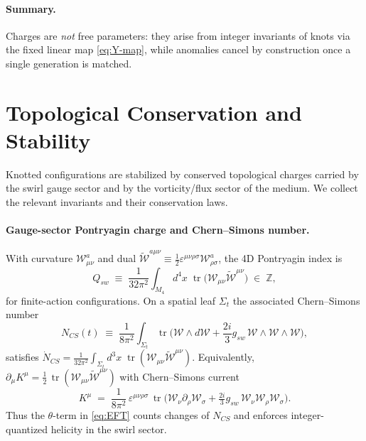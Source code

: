 \documentclass[11pt, preprint,titlepage]{revtex4-2}
\begin{document}
	\paragraph{Summary.}
	Charges are \emph{not} free parameters: they arise from integer invariants of knots via the fixed linear map \eqref{eq:Y-map}, while anomalies cancel by construction once a single generation is matched.

	\section{Topological Conservation and Stability}

	Knotted configurations are stabilized by conserved topological charges carried by the swirl gauge sector and by the vorticity/flux sector of the medium. We collect the relevant invariants and their conservation laws.

	\paragraph{Gauge-sector Pontryagin charge and Chern--Simons number.}
	With curvature \(\mathcal{W}_{\mu\nu}^a\) and dual \(\tilde{\mathcal{W}}^{a\mu\nu} \equiv \tfrac12 \varepsilon^{\mu\nu\rho\sigma}\mathcal{W}^a_{\rho\sigma}\),
	the 4D Pontryagin index is
	\begin{equation}
		Q_{\!sw} \;\equiv\; \frac{1}{32\pi^2} \int_{M_4} \! d^4x\; \mathop{\mathrm{tr}}\!\big(\mathcal{W}_{\mu\nu}\tilde{\mathcal{W}}^{\mu\nu}\big) \;\in\; \mathbb{Z},
		\label{eq:Qsw}
	\end{equation}
	for finite-action configurations. On a spatial leaf \(\Sigma_t\) the associated Chern--Simons number
	\begin{equation}
		N_{\!CS}(t) \;\equiv\; \frac{1}{8\pi^2} \int_{\Sigma_t} \mathop{\mathrm{tr}}\!\Big(\mathcal{W}\wedge d\mathcal{W} + \frac{2i}{3} g_{\!sw}\,\mathcal{W}\wedge\mathcal{W}\wedge\mathcal{W}\Big),
	\end{equation}
	satisfies \(\dot N_{\!CS}=\tfrac{1}{32\pi^2}\!\int_{\Sigma_t}\! d^3x\;\mathop{\mathrm{tr}}(\mathcal{W}_{\mu\nu}\tilde{\mathcal{W}}^{\mu\nu})\).
	Equivalently,
	\(\partial_\mu K^\mu=\tfrac12\,\mathop{\mathrm{tr}}(\mathcal{W}_{\mu\nu}\tilde{\mathcal{W}}^{\mu\nu})\)
	with Chern--Simons current
	\begin{equation}
		K^\mu \;=\; \frac{1}{8\pi^2}\,\varepsilon^{\mu\nu\rho\sigma}\,\mathop{\mathrm{tr}}\!\Big(\mathcal{W}_\nu\partial_\rho\mathcal{W}_\sigma + \tfrac{2i}{3} g_{\!sw}\,\mathcal{W}_\nu\mathcal{W}_\rho\mathcal{W}_\sigma\Big).
	\end{equation}
	Thus the \(\theta\)-term in \eqref{eq:EFT} counts changes of \(N_{\!CS}\) and enforces integer-quantized helicity in the swirl sector.
\end{document}
